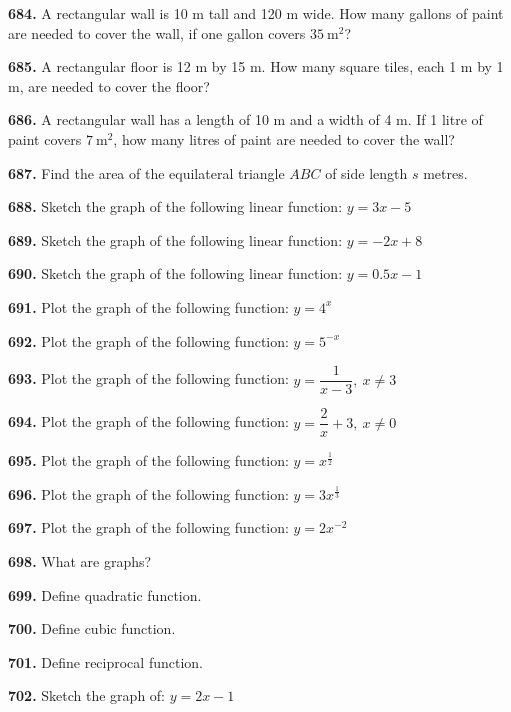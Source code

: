 \documentclass[11pt]{article}
\begin{document}
\bigskip
\noindent\textbf{684.} A rectangular wall is 10 m tall and 120 m wide. How many gallons of paint are needed to cover the wall, if one gallon covers $35\ \text{m}^2$?

\bigskip
\noindent\textbf{685.} A rectangular floor is 12 m by 15 m. How many square tiles, each 1 m by 1 m, are needed to cover the floor?

\bigskip
\noindent\textbf{686.} A rectangular wall has a length of 10 m and a width of 4 m. If 1 litre of paint covers $7\ \text{m}^2$, how many litres of paint are needed to cover the wall?

\bigskip
\noindent\textbf{687.} Find the area of the equilateral triangle $ABC$ of side length $s$ metres.

\bigskip
\noindent\textbf{688.} Sketch the graph of the following linear function: $y=3x-5$

\bigskip
\noindent\textbf{689.} Sketch the graph of the following linear function: $y=-2x+8$

\bigskip
\noindent\textbf{690.} Sketch the graph of the following linear function: $y=0.5x-1$

\bigskip
\noindent\textbf{691.} Plot the graph of the following function: $y=4^x$

\bigskip
\noindent\textbf{692.} Plot the graph of the following function: $y=5^{-x}$

\bigskip
\noindent\textbf{693.} Plot the graph of the following function: $y=\dfrac{1}{x-3},\ x\ne 3$

\bigskip
\noindent\textbf{694.} Plot the graph of the following function: $y=\dfrac{2}{x}+3,\ x\ne 0$

\bigskip
\noindent\textbf{695.} Plot the graph of the following function: $y=x^{\frac{1}{2}}$

\bigskip
\noindent\textbf{696.} Plot the graph of the following function: $y=3x^{\frac{1}{3}}$

\bigskip
\noindent\textbf{697.} Plot the graph of the following function: $y=2x^{-2}$

\bigskip
\noindent\textbf{698.} What are graphs?

\bigskip
\noindent\textbf{699.} Define quadratic function.

\bigskip
\noindent\textbf{700.} Define cubic function.

\bigskip
\noindent\textbf{701.} Define reciprocal function.

\bigskip
\noindent\textbf{702.} Sketch the graph of: $y=2x-1$
\end{document}
